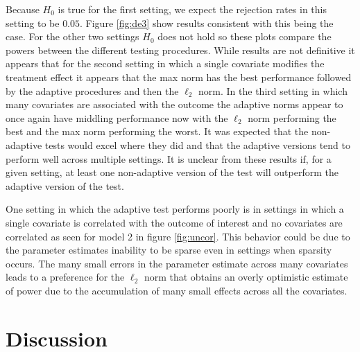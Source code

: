 \documentclass{article}
\newcommand{\sh}{\textcolor{red}}
\begin{document}
Because $H_0$ is true for the first setting, we expect the rejection rates in this setting to be $0.05$.  Figure \ref{fig:de3} show results consistent with this being the case. For the other two settings $H_0$ does not hold so these plots compare the powers between the different testing procedures. While results are not definitive it appears that for the second setting in which a single covariate modifies the treatment effect it appears that the max norm has the best performance followed by the adaptive procedures and then the $\ell_2$ norm. In the third setting in which many covariates are associated with the outcome the adaptive norms appear to once again have middling performance now with the $\ell_2$ norm performing the best and the max norm performing the worst. It was expected that the non-adaptive tests would excel where they did and that the adaptive versions tend to perform well across multiple settings.  It is unclear from these results if, for a given setting, at least one non-adaptive version of the test will outperform the adaptive version of the test.

One setting in which the adaptive test performs poorly is in settings in which a single covariate is correlated with the outcome of interest and no covariates are correlated as seen for model 2 in figure \ref{fig:uncor}. This behavior could be due to the parameter estimates inability to be sparse even in settings when sparsity occurs.  The many small errors in the parameter estimate across many covariates leads to a preference for the $\ell_2$ norm that obtains an overly optimistic estimate of power due to the accumulation of many small effects across all the covariates.



\section{Discussion}
\label{sec:discuss}
\end{document}
